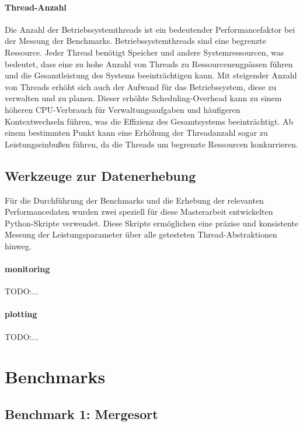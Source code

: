 \documentclass[fontsize=12pt,paper=a4,twoside=semi,parskip=half-,headsepline,headinclude]{scrreprt}
\begin{document}
\subsubsection{Thread-Anzahl}

Die Anzahl der Betriebssystemthreads ist ein bedeutender Performancefaktor bei der Messung der Benchmarks. Betriebssystemthreads sind eine begrenzte Ressource. Jeder Thread benötigt Speicher und andere Systemressourcen, was bedeutet, dass eine zu hohe Anzahl von Threads zu Ressourcenengpässen führen und die Gesamtleistung des Systems beeinträchtigen kann. Mit steigender Anzahl von Threads erhöht sich auch der Aufwand für das Betriebssystem, diese zu verwalten und zu planen. Dieser erhöhte Scheduling-Overhead kann zu einem höheren CPU-Verbrauch für Verwaltungsaufgaben und häufigeren Kontextwechseln führen, was die Effizienz des Gesamtsystems beeinträchtigt. Ab einem bestimmten Punkt kann eine Erhöhung der Threadanzahl sogar zu Leistungseinbußen führen, da die Threads um begrenzte Ressourcen konkurrieren.

\section{Werkzeuge zur Datenerhebung}

Für die Durchführung der Benchmarks und die Erhebung der relevanten Performancedaten wurden zwei speziell für diese Masterarbeit entwickelten Python-Skripte verwendet. Diese Skripte ermöglichen eine präzise und konsistente Messung der Leistungsparameter über alle getesteten Thread-Abstraktionen hinweg.

\subsubsection{monitoring}

TODO:...

\subsubsection{plotting}

TODO:...

\chapter{Benchmarks}

\section{Benchmark 1: Mergesort}
\end{document}
